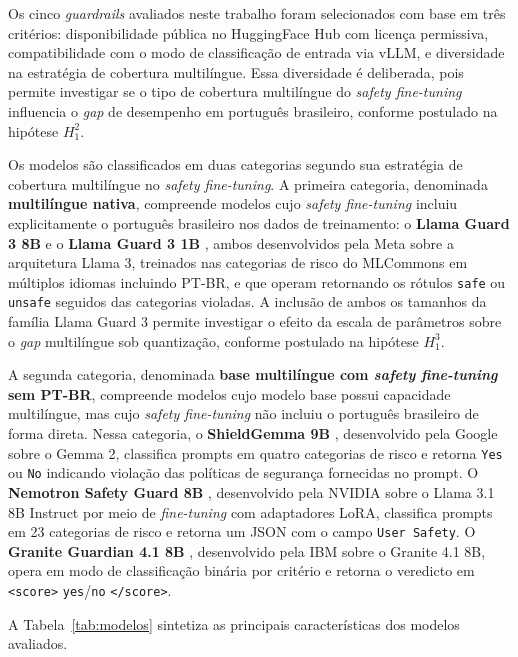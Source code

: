 Os cinco \textit{guardrails} avaliados neste trabalho foram selecionados com base em três critérios: disponibilidade pública no HuggingFace Hub com licença permissiva, compatibilidade com o modo de classificação de entrada via vLLM, e diversidade na estratégia de cobertura multilíngue. Essa diversidade é deliberada, pois permite investigar se o tipo de cobertura multilíngue do \textit{safety fine-tuning} influencia o \textit{gap} de desempenho em português brasileiro, conforme postulado na hipótese $H_1^2$.

Os modelos são classificados em duas categorias segundo sua estratégia de cobertura multilíngue no \textit{safety fine-tuning}. A primeira categoria, denominada \textbf{multilíngue nativa}, compreende modelos cujo \textit{safety fine-tuning} incluiu explicitamente o português brasileiro nos dados de treinamento: o \textbf{Llama Guard 3 8B} \cite{metallamaguard32024} e o \textbf{Llama Guard 3 1B} \cite{metallamaguard32024}, ambos desenvolvidos pela Meta sobre a arquitetura Llama 3, treinados nas categorias de risco do MLCommons em múltiplos idiomas incluindo PT-BR, e que operam retornando os rótulos \texttt{safe} ou \texttt{unsafe} seguidos das categorias violadas. A inclusão de ambos os tamanhos da família Llama Guard 3 permite investigar o efeito da escala de parâmetros sobre o \textit{gap} multilíngue sob quantização, conforme postulado na hipótese $H_1^3$.

A segunda categoria, denominada \textbf{base multilíngue com \textit{safety fine-tuning} sem PT-BR}, compreende modelos cujo modelo base possui capacidade multilíngue, mas cujo \textit{safety fine-tuning} não incluiu o português brasileiro de forma direta. Nessa categoria, o \textbf{ShieldGemma 9B} \cite{zeng2024shieldgemma}, desenvolvido pela Google sobre o Gemma 2, classifica prompts em quatro categorias de risco e retorna \texttt{Yes} ou \texttt{No} indicando violação das políticas de segurança fornecidas no prompt. O \textbf{Nemotron Safety Guard 8B} \cite{joshi2025cultureguard}, desenvolvido pela NVIDIA sobre o Llama 3.1 8B Instruct por meio de \textit{fine-tuning} com adaptadores LoRA, classifica prompts em 23 categorias de risco e retorna um JSON com o campo \texttt{User Safety}. O \textbf{Granite Guardian 4.1 8B} \cite{granite2024}, desenvolvido pela IBM sobre o Granite 4.1 8B, opera em modo de classificação binária por critério e retorna o veredicto em \texttt{<score>} \texttt{yes}/\texttt{no} \texttt{</score>}.

A Tabela~\ref{tab:modelos} sintetiza as principais características dos modelos avaliados.


